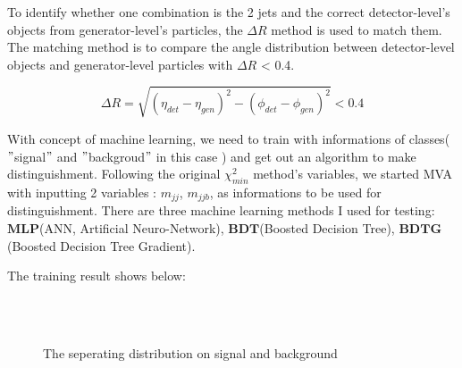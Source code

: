 			To identify whether one combination is the 2 jets and the correct detector-level's objects from generator-level's particles, the $\Delta R$ method is used to match them. The matching method is to compare the angle distribution between detector-level objects and generator-level particles with $\Delta R$ < 0.4. 
			
			\begin{equation}
			\Delta R = \sqrt{ (\eta_{det} - \eta_{gen})^2 - (\phi_{det} - \phi_{gen})^2 } < 0.4
			\label{eq:gen_matching}
			\end{equation}
		
			With concept of machine learning, we need to train with informations of classes( $"$signal$"$ and $"$backgroud$"$ in this case ) and get out an algorithm to make distinguishment. Following the original $\chi^2_{min}$ method's variables, we started MVA with inputting 2 variables : $m_{jj}$, $m_{jjb}$, as informations to be used for distinguishment. There are three machine learning methods I used for testing: $\textbf{MLP}$(ANN, Artificial Neuro-Network), $\textbf{BDT}$(Boosted Decision Tree), $\textbf{BDTG}$(Boosted Decision Tree Gradient). 

			The training result shows below:

\begin{figure}[H]
\centering
    \\
    \\
\caption{The seperating distribution on signal and background}
\label{EventSelReco:fig:Sep_a04}
\end{figure}
\FloatBarrier

